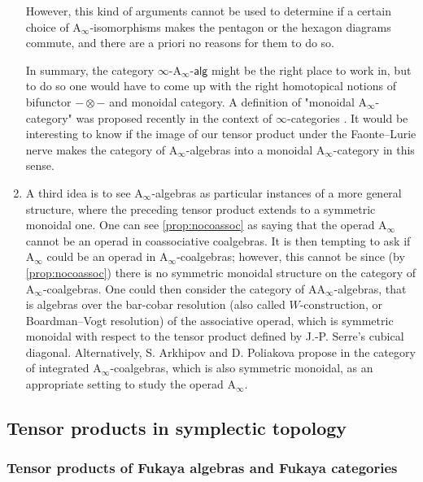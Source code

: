\documentclass[twoside, 12pt]{amsart}
\theoremstyle{remark}
\newcommand{\Ainf}{\mathrm{A}_\infty} %
\newcommand{\AAinf}{\mathrm{AA}_\infty} %
\newcommand{\infAalg}{\ensuremath{\infty\text{-}\mathrm{A}_\infty\text{-}\mathsf{alg}}} %
\begin{document}
\begin{enumerate}[leftmargin=*, itemsep=0.5em]
However, this kind of arguments cannot be used to determine if a certain choice of $\Ainf$-isomorphisms makes the pentagon or the hexagon diagrams commute, and there are a priori no reasons for them to do so. 

In summary, the category $\infAalg$ might be the right place to work in, but to do so one would have to come up with the right homotopical notions of bifunctor $- \otimes -$ and monoidal category. 
A definition of "monoidal $\Ainf$-category" was proposed recently in the context of $\infty$-categories \cite[Definition A.5.3]{Pascaleff18}.
It would be interesting to know if the image of our tensor product under the Faonte--Lurie nerve \cite{Faonte17} makes the category of $\Ainf$-algebras into a monoidal $\Ainf$-category in this sense. 

\item A third idea is to see $\Ainf$-algebras as particular instances of a more general structure, where the preceding tensor product extends to a symmetric monoidal one.  
One can see \cref{prop:nocoassoc} as saying that the operad $\Ainf$ cannot be an operad in coassociative coalgebras. 
It is then tempting to ask if $\Ainf$ could be an operad in $\Ainf$-coalgebras; however, this cannot be since (by \cref{prop:nocoassoc}) there is no symmetric monoidal structure on the category of $\Ainf$-coalgebras.
One could then consider the category of $\AAinf$-algebras, that is algebras over the bar-cobar resolution (also called $W$-construction, or Boardman--Vogt resolution) of the associative operad, which is symmetric monoidal with respect to the tensor product defined by J.-P. Serre's cubical diagonal. 
Alternatively, S. Arkhipov and D. Poliakova propose in \cite{PoliakovaArkhipov21} the category of integrated $\Ainf$-coalgebras, which is also symmetric monoidal, as an appropriate setting to study the operad $\Ainf$. 
\end{enumerate}


\subsection{Tensor products in symplectic topology} \label{sec:furtherdirections}


\subsubsection{Tensor products of Fukaya algebras and Fukaya categories}
\end{document}
